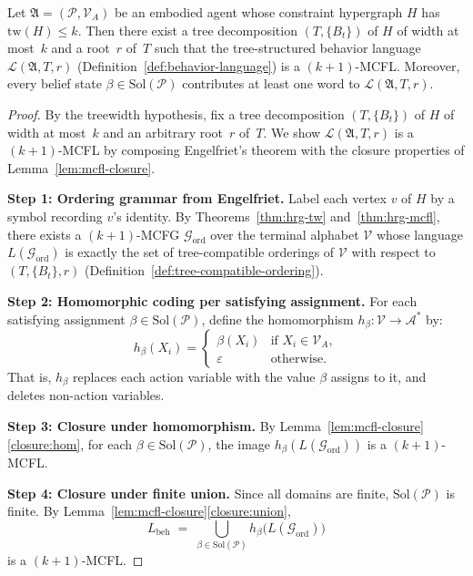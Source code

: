 \documentclass[runningheads]{llncs}
\begin{document}
\begin{theorem}\label{thm:bridge}
Let $\mathfrak{A} = (\mathcal{P}, \mathcal{V}_A)$ be an embodied agent whose constraint hypergraph $H$ has $\mathrm{tw}(H) \leq k$.
Then there exist a tree decomposition $(T, \{B_t\})$ of $H$ of width at most~$k$ and a root~$r$ of~$T$ such that the tree-structured behavior language $\mathcal{L}(\mathfrak{A}, T, r)$ (Definition~\ref{def:behavior-language}) is a $(k{+}1)$-MCFL.
Moreover, every belief state $\beta \in \mathrm{Sol}(\mathcal{P})$ contributes at least one word to $\mathcal{L}(\mathfrak{A}, T, r)$.
\end{theorem}

\begin{proof}
By the treewidth hypothesis, fix a tree decomposition $(T, \{B_t\})$ of $H$ of width at most~$k$ and an arbitrary root~$r$ of~$T$.
We show $\mathcal{L}(\mathfrak{A}, T, r)$ is a $(k{+}1)$-MCFL by composing Engelfriet's theorem with the closure properties of Lemma~\ref{lem:mcfl-closure}.

\medskip
\noindent\textbf{Step 1: Ordering grammar from Engelfriet.}
Label each vertex $v$ of $H$ by a symbol recording $v$'s identity.
By Theorems~\ref{thm:hrg-tw} and~\ref{thm:hrg-mcfl}, there exists a $(k{+}1)$-MCFG $\mathcal{G}_{\mathrm{ord}}$ over the terminal alphabet $\mathcal{V}$ whose language $L(\mathcal{G}_{\mathrm{ord}})$ is exactly the set of tree-compatible orderings of $\mathcal{V}$ with respect to $(T, \{B_t\}, r)$ (Definition~\ref{def:tree-compatible-ordering}).

\medskip
\noindent\textbf{Step 2: Homomorphic coding per satisfying assignment.}
For each satisfying assignment $\beta \in \mathrm{Sol}(\mathcal{P})$, define the homomorphism $h_\beta\colon \mathcal{V} \to \mathcal{A}^*$ by:
\[
  h_\beta(X_i) = \begin{cases} \beta(X_i) & \text{if } X_i \in \mathcal{V}_A, \\ \varepsilon & \text{otherwise.} \end{cases}
\]
That is, $h_\beta$ replaces each action variable with the value $\beta$ assigns to it, and deletes non-action variables.

\medskip
\noindent\textbf{Step 3: Closure under homomorphism.}
By Lemma~\ref{lem:mcfl-closure}\ref{closure:hom}, for each $\beta \in \mathrm{Sol}(\mathcal{P})$, the image $h_\beta(L(\mathcal{G}_{\mathrm{ord}}))$ is a $(k{+}1)$-MCFL.

\medskip
\noindent\textbf{Step 4: Closure under finite union.}
Since all domains are finite, $\mathrm{Sol}(\mathcal{P})$ is finite.
By Lemma~\ref{lem:mcfl-closure}\ref{closure:union},
\[
  L_{\mathrm{beh}} \;=\; \bigcup_{\beta \in \mathrm{Sol}(\mathcal{P})} h_\beta\big(L(\mathcal{G}_{\mathrm{ord}})\big)
\]
is a $(k{+}1)$-MCFL.


\end{proof}
\end{document}
